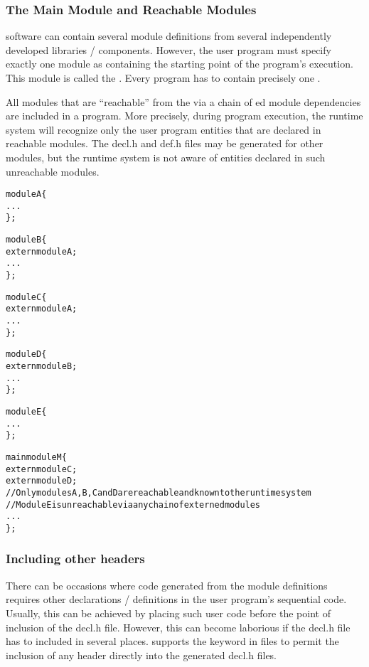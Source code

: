 \subsubsection{The Main Module and Reachable Modules}

\charm software can contain several module definitions from several
independently developed libraries / components. However, the user program must
specify exactly one module as containing the starting point of the program's
execution. This module is called the . Every \charm program
has to contain precisely one .

All modules that are ``reachable'' from the  via a chain of
ed module dependencies are included in a \charm program. More
precisely, during program execution, the \charm runtime system will recognize
only the user program entities that are declared in reachable modules. The
decl.h and def.h files may be generated for other modules, but the runtime
system is not aware of entities declared in such unreachable modules.

\begin{alltt}
module A \{
    ...
\};

module B \{
    extern module A;
    ...
\};

module C \{
    extern module A;
    ...
\};

module D \{
    extern module B;
    ...
\};

module E \{
    ...
\};

mainmodule M \{
    extern module C;
    extern module D;
    // Only modules A, B, C and D are reachable and known to the runtime system
    // Module E is unreachable via any chain of externed modules
    ...
\};
\end{alltt}


\subsubsection{Including other headers}

There can be occasions where code generated from the module definitions
requires other declarations / definitions in the user program's sequential
code. Usually, this can be achieved by placing such user code before the point
of inclusion of the decl.h file. However, this can become laborious if the
decl.h file has to included in several places. \charm supports the keyword
 in \ci files to permit the inclusion of any header directly into
the generated decl.h files.

